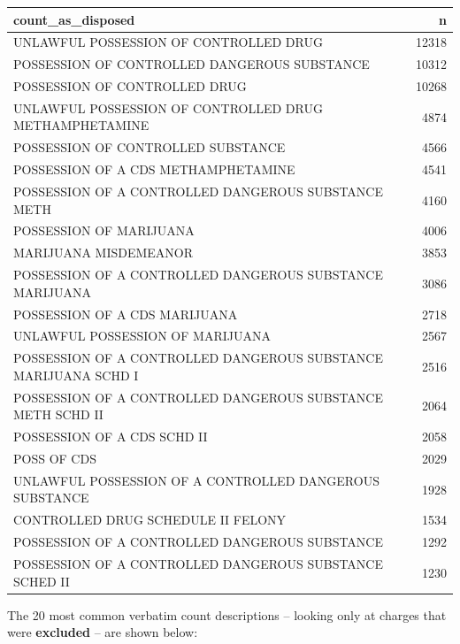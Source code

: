 \documentclass[
  letterpaper,
  DIV=11,
  numbers=noendperiod]{scrartcl}
\begin{document}
\begin{longtable*}{lr}
\toprule
count\_as\_disposed & n \\ 
\midrule
UNLAWFUL POSSESSION OF CONTROLLED DRUG & 12318 \\ 
POSSESSION OF CONTROLLED DANGEROUS SUBSTANCE & 10312 \\ 
POSSESSION OF CONTROLLED DRUG & 10268 \\ 
UNLAWFUL POSSESSION OF CONTROLLED DRUG METHAMPHETAMINE & 4874 \\ 
POSSESSION OF CONTROLLED SUBSTANCE & 4566 \\ 
POSSESSION OF A CDS METHAMPHETAMINE & 4541 \\ 
POSSESSION OF A CONTROLLED DANGEROUS SUBSTANCE METH & 4160 \\ 
POSSESSION OF MARIJUANA & 4006 \\ 
MARIJUANA MISDEMEANOR & 3853 \\ 
POSSESSION OF A CONTROLLED DANGEROUS SUBSTANCE MARIJUANA & 3086 \\ 
POSSESSION OF A CDS MARIJUANA & 2718 \\ 
UNLAWFUL POSSESSION OF MARIJUANA & 2567 \\ 
POSSESSION OF A CONTROLLED DANGEROUS SUBSTANCE MARIJUANA SCHD I & 2516 \\ 
POSSESSION OF A CONTROLLED DANGEROUS SUBSTANCE METH SCHD II & 2064 \\ 
POSSESSION OF A CDS SCHD II & 2058 \\ 
POSS OF CDS & 2029 \\ 
UNLAWFUL POSSESSION OF A CONTROLLED DANGEROUS SUBSTANCE & 1928 \\ 
CONTROLLED DRUG SCHEDULE II FELONY & 1534 \\ 
POSSESSION OF A CONTROLLED DANGEROUS SUBSTANCE & 1292 \\ 
POSSESSION OF A CONTROLLED DANGEROUS SUBSTANCE SCHED II & 1230 \\ 
\bottomrule
\end{longtable*}

The 20 most common verbatim count descriptions -- looking only at
charges that were \textbf{excluded} -- are shown below:
\end{document}

